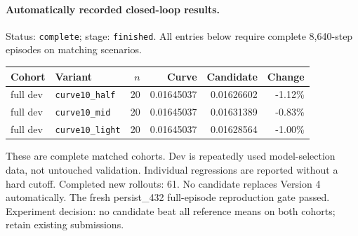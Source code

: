 \paragraph{Automatically recorded closed-loop results.}
Status: \texttt{complete}; stage: \texttt{finished}.
All entries below require complete 8,640-step episodes on matching scenarios.
\begin{center}\small
\begin{tabular}{llrrrr}\toprule
Cohort & Variant & $n$ & Curve & Candidate & Change \\\midrule
full dev & \texttt{curve10\_half} & 20 & 0.01645037 & 0.01626602 & -1.12\% \\
full dev & \texttt{curve10\_mid} & 20 & 0.01645037 & 0.01631389 & -0.83\% \\
full dev & \texttt{curve10\_light} & 20 & 0.01645037 & 0.01628564 & -1.00\% \\
\bottomrule\end{tabular}\end{center}
These are complete matched cohorts. Dev is repeatedly used model-selection data, not untouched validation. Individual regressions are reported without a hard cutoff.
Completed new rollouts: 61. No candidate replaces Version 4 automatically.
The fresh persist\_432 full-episode reproduction gate passed.
Experiment decision: no candidate beat all reference means on both cohorts; retain existing submissions.
